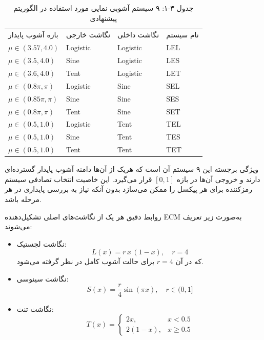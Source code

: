 \begin{table}[h]
\centering
\small
\begin{tabular}{llll}
\hline
بازه آشوب پایدار & نگاشت خارجی & نگاشت داخلی & نام سیستم \\
$\mu \in (3.57, 4.0)$ & Logistic & Logistic & LEL \\
$\mu \in (3.5, 4.0)$ & Sine & Logistic & LES \\
$\mu \in (3.6, 4.0)$ & Tent & Logistic & LET \\
$\mu \in (0.8\pi, \pi)$ & Logistic & Sine & SEL \\
$\mu \in (0.85\pi, \pi)$ & Sine & Sine & SES \\
$\mu \in (0.8\pi, \pi)$ & Tent & Sine & SET \\
$\mu \in (0.5, 1.0)$ & Logistic & Tent & TEL \\
$\mu \in (0.5, 1.0)$ & Sine & Tent & TES \\
$\mu \in (0.5, 1.0)$ & Tent & Tent & TET \\
\hline
\end{tabular}
\caption{جدول ‏۳‏-‏۱‏: ۹ سیستم آشوبی نمایی مورد استفاده در الگوریتم پیشنهادی}
\end{table}

ویژگی برجسته این ۹ سیستم آن است که هریک از آن‌ها دامنه آشوب پایدار گسترده‌ای دارند و خروجی آن‌ها در بازه $[0,1]$ قرار می‌گیرد\cite{ref4, ref1}. این خاصیت انتخاب تصادفی سیستم رمزکننده برای هر پیکسل را ممکن می‌سازد بدون آنکه نیاز به بررسی پایداری در هر مرحله باشد.

روابط دقیق هر یک از نگاشت‌های اصلی تشکیل‌دهنده ECM به‌صورت زیر تعریف می‌شوند:

\begin{itemize}
    \item نگاشت لجستیک:
    \begin{equation}
    L(x) = r\,x\,(1-x), \quad r=4
    
    \end{equation}
    که در آن $r=4$ برای حالت آشوب کامل در نظر گرفته می‌شود.
\end{itemize}

\begin{itemize}
    \item نگاشت سینوسی:
    \begin{equation}
    S(x) = \frac{r}{4}\sin(\pi x), \quad r \in (0,1]
    
    \end{equation}
\end{itemize}

\begin{itemize}
    \item نگاشت تنت:
    \begin{equation}
    T(x) = \begin{cases}
    2x, & x < 0.5 \\
    2(1-x), & x \geq 0.5
    \end{cases}
    
    \end{equation}
\end{itemize}


